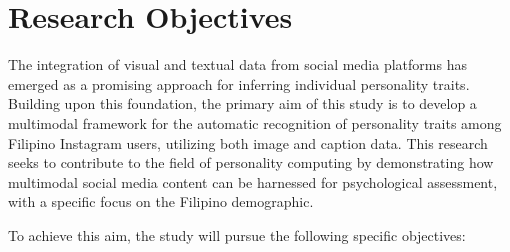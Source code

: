 




\section{Research Objectives}
\label{sec: objectives}
The integration of visual and textual data from social media platforms has emerged as a promising approach for inferring individual personality traits. Building upon this foundation, the primary aim of this study is to develop a multimodal framework for the automatic recognition of personality traits among Filipino Instagram users, utilizing both image and caption data. This research seeks to contribute to the field of personality computing by demonstrating how multimodal social media content can be harnessed for psychological assessment, with a specific focus on the Filipino demographic.

To achieve this aim, the study will pursue the following specific objectives:

